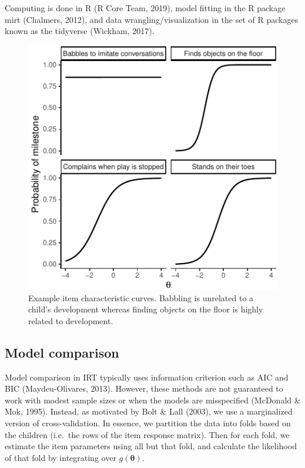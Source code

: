 \documentclass[10pt, letterpaper]{article}
\newenvironment{CodeChunk}{}{}
\begin{document}
Computing is done in R (R Core Team, 2019), model fitting in the R
package mirt (Chalmers, 2012), and data wrangling/visualization in the
set of R packages known as the tidyverse (Wickham, 2017).

\begin{CodeChunk}
\begin{figure}[tb]
\includegraphics{figs/icc-1} \caption[Example item characteristic curves]{Example item characteristic curves. Babbling is unrelated to a child's development whereas finding objects on the floor is highly related to development.}\label{fig:icc}
\end{figure}
\end{CodeChunk}

\hypertarget{modelcompare}{%
\subsection{Model comparison}\label{modelcompare}}

Model comparison in IRT typically uses information criterion such as AIC
and BIC (Maydeu-Olivares, 2013). However, these methods are not
guaranteed to work with modest sample sizes or when the models are
misspecified (McDonald \& Mok, 1995). Instead, as motivated by Bolt \&
Lall (2003), we use a marginalized version of cross-validation. In
essence, we partition the data into folds based on the children
(i.e.~the rows of the item response matrix). Then for each fold, we
estimate the item parameters using all but that fold, and calculate the
likelihood of that fold by integrating over \(g(\boldsymbol{\theta})\).
\end{document}
